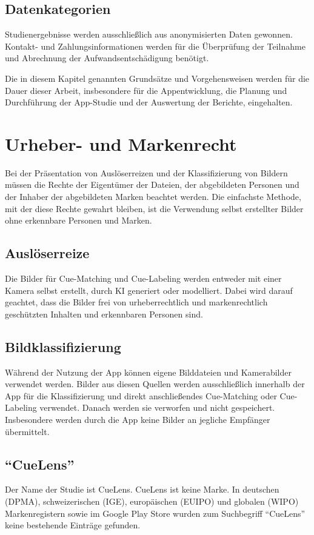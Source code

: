 \subsection{Datenkategorien}
Studienergebnisse werden ausschließlich aus anonymisierten Daten gewonnen. Kontakt- und Zahlungsinformationen werden für die Überprüfung der Teilnahme und Abrechnung der Aufwandsentschädigung benötigt. 

Die in diesem Kapitel genannten Grundsätze und Vorgehensweisen werden für die Dauer dieser Arbeit, insbesondere für die Appentwicklung, die Planung und Durchführung der App-Studie und der Auswertung der Berichte, eingehalten.

\section{Urheber- und Markenrecht}
Bei der Präsentation von Auslöserreizen und der Klassifizierung von Bildern müssen die Rechte der Eigentümer der Dateien, der abgebildeten Personen und der Inhaber der abgebildeten Marken beachtet werden. Die einfachste Methode, mit der diese Rechte gewahrt bleiben, ist die Verwendung selbst erstellter Bilder ohne erkennbare Personen und Marken.

\subsection{Auslöserreize}
Die Bilder für Cue-Matching und Cue-Labeling werden entweder mit einer Kamera selbst erstellt, durch KI generiert oder modelliert. Dabei wird darauf geachtet, dass die Bilder frei von urheberrechtlich und markenrechtlich geschützten Inhalten und erkennbaren Personen sind.

\subsection{Bildklassifizierung}
Während der Nutzung der App können eigene Bilddateien und Kamerabilder verwendet werden. Bilder aus diesen Quellen werden ausschließlich innerhalb der App für die Klassifizierung und direkt anschließendes Cue-Matching oder Cue-Labeling verwendet. Danach werden sie verworfen und nicht gespeichert. Insbesondere werden durch die App keine Bilder an jegliche Empfänger übermittelt.

\subsection{"`CueLens"'}
  Der Name der Studie ist CueLens. CueLens ist keine Marke. In deutschen (DPMA), schweize\-rischen (IGE), europäischen (EUIPO) und globalen (WIPO) Markenregistern sowie im Google Play Store wurden zum Suchbegriff "`CueLens"' keine bestehende Einträge gefunden.

